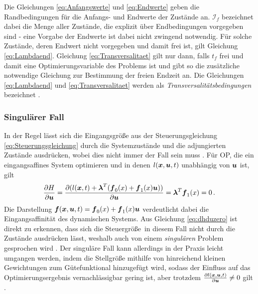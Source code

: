 Die Gleichungen \eqref{eq:Anfangswerte} und \eqref{eq:Endwerte} geben die Randbedingungen für die Anfangs- und Endwerte der Zustände an. $\mathcal{I}_f$ bezeichnet dabei die Menge aller Zustände, die explizit über Endbedingungen vorgegeben sind - eine Vorgabe der Endwerte ist dabei nicht zwingend notwendig. Für solche Zustände, deren Endwert nicht vorgegeben und damit frei ist, gilt Gleichung \eqref{eq:Lambdaend}. Gleichung \eqref{eq:Transversalitaet} gilt nur dann, falls $t_f$ frei und damit eine Optimierungsvariable des Problems ist und gibt so die zusätzliche notwendige Gleichung zur Bestimmung der freien Endzeit an. Die Gleichungen \eqref{eq:Lambdaend} und \eqref{eq:Transversalitaet} werden als \textit{Transversalitätsbedingungen} bezeichnet \cite{KnutGraichen.2012}. 
\subsubsection{Singulärer Fall}\label{subsubsec:Singularität}
In der Regel lässt sich die Eingangsgröße aus der Steuerungsgleichung \eqref{eq:Steuerungsgleichung} durch die Systemzustände und die adjungierten Zustände ausdrücken, wobei dies nicht immer der Fall sein muss \cite{KnutGraichen.2012}. Für \gls{OP}, die ein eingangsaffines System optimieren und in denen $l(\boldsymbol{x},\boldsymbol{u},t)$ unabhängig von $\boldsymbol{u}$ ist, gilt 
\begin{equation}
	\frac{\partial H}{\partial \boldsymbol{u}} = \frac{\partial (l(\boldsymbol{x},t) + \boldsymbol{\lambda}^T(\boldsymbol{f}_0(x)+\boldsymbol{f}_1(x)\boldsymbol{u}))}{\partial \boldsymbol{u}} = \boldsymbol{\lambda}^T\boldsymbol{f}_1(x) = 0 \,. \label{eq:dhduzero}
\end{equation}
Die Darstellung $\boldsymbol{f}(\boldsymbol{x},\boldsymbol{u},t) = \boldsymbol{f}_0(x)+\boldsymbol{f}_1(x)\boldsymbol{u}$ verdeutlicht dabei die Eingangsaffinität des dynamischen Systems. Aus Gleichung \eqref{eq:dhduzero} ist direkt zu erkennen, dass sich die Steuergröße \uoft\,in diesem Fall nicht durch die Zustände ausdrücken lässt, weshalb auch von einem \textit{singulären} Problem gesprochen wird \cite{KnutGraichen.2012}. Der singuläre Fall kann allerdings in der Praxis leicht umgangen werden, indem die Stellgröße mithilfe von hinreichend kleinen Gewichtungen zum Gütefunktional hinzugefügt wird, sodass der Einfluss auf das Optimierungsergebnis vernachlässigbar gering ist, aber trotzdem $\frac{\partial l(\boldsymbol{x},\boldsymbol{u},t)}{\partial \boldsymbol{u}} \neq 0$ gilt \cite{KnutGraichen.2012}.

